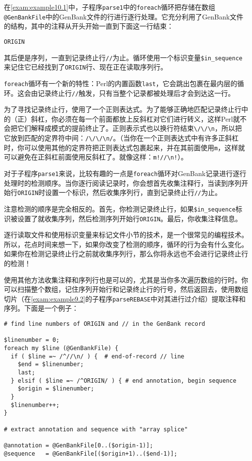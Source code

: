 在\autoref{exam:example10.1}中，子程序\verb|parse1|中的\verb|foreach|循环把存储在数组\verb|@GenBankFile|中的GenBank文件的行进行逐行处理。它充分利用了GenBank文件的结构，其中的注释从开头开始一直到下面这一行结束：

\verb|ORIGIN|

其后便是序列，一直到记录终止行\verb|//|为止。循环使用一个标识变量\verb|$in_sequence|来记住它已经找到了\verb|ORIGIN|行、现在正在读取序列行。

\verb|foreach|循环有一个新的特性：Perl的内置函数\verb|last|，它会跳出包裹在最内层的循环。这会由记录终止行\verb|//|触发，只有当整个记录都被处理后才会到达这一行。

为了寻找记录终止行，使用了一个正则表达式。为了能够正确地匹配记录终止行中的（正）斜杠，你必须在每一个前面都放上反斜杠对它们进行转义，这样Perl就不会把它们解释成模式的提前终止了。正则表示式也以换行符结束\verb|\/\/\n|，所以把它放到匹配的定界符中间：\verb|/\/\/\n/|。（当你在一个正则表达式中有许多正斜杠时，你可以使用其他的定界符把正则表达式包裹起来，并在其前面使用\verb|m|，这样就可以避免在正斜杠前面使用反斜杠了。就像这样：\verb|m!//\n!|）。

对于子程序\verb|parse1|来说，比较有趣的一点是\verb|foreach|循环对GenBank记录进行逐行处理时的检测顺序。当你逐行阅读记录时，你会想首先收集注释行，当读到序列开始行\verb|ORIGIN|时设置一个标识，然后收集序列行，直到记录终止行\verb|//|为止。

注意检测的顺序是完全相反的。首先，你检测记录终止行，如果\verb|$in_sequence|标识被设置了就收集序列，然后检测序列开始行\verb|ORIGIN|。最后，你收集注释信息。

逐行读取文件和使用标识变量来标记文件小节的技术，是一个很常见的编程技术。所以，花点时间来想一下，如果你改变了检测的顺序，循环的行为会有什么变化。如果你在检测记录终止行之前就收集序列行，那么你将永远也不会进行记录终止行的检测！

使用其他方法收集注释和序列行也是可以的，尤其是当你多次遍历数组的行时。你可以扫描整个数组，记住序列开始行和记录终止行的行号，然后返回去，使用数组切片（在\autoref{exam:example9.2}的子程序\verb|parseREBASE|中对其进行过介绍）提取注释和序列。下面是一个例子：

\begin{lstlisting}
# find line numbers of ORIGIN and // in the GenBank record

$linenumber = 0;
foreach my $line (@GenBankFile) {
  if ( $line =~ /^//\n/ ) {  # end-of-record // line
    $end = $linenumber;
    last;
  } elsif ( $line =~ /^ORIGIN/ ) { # end annotation, begin sequence
    $origin = $linenumber;
  }
  $linenumber++;
}

# extract annotation and sequence with "array splice"

@annotation = @GenBankFile[0..($origin-1)];
@sequence   = @GenBankFile[($origin+1)..($end-1)];
\end{lstlisting}

